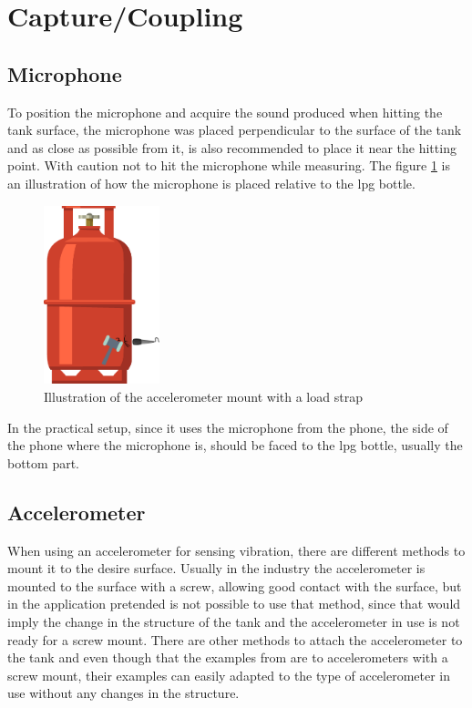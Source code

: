 \section{Capture/Coupling}\label{sec:CaptureCoupling}
\subsection{Microphone}
To position the microphone and acquire the sound produced when hitting the tank surface, the microphone was placed perpendicular to the surface of the tank and as close as possible from it, is also recommended to place it near the hitting point. With caution not to hit the microphone while measuring. The figure \ref{fig:micmount} is an illustration of how the microphone is placed relative to the \acrshort{lpg} bottle.
\begin{figure}[]
    \centering
    \includegraphics[width=0.3\textwidth]{Chapters/4CHP/Figures/micWimpactHamm.eps}
    \caption{Illustration of the accelerometer mount with a load strap}
    \label{fig:micmount}
\end{figure}
In the practical setup, since it uses the microphone from the phone, the side of the phone where the microphone is, should be faced to the \acrshort{lpg} bottle, usually the bottom part.
\subsection{Accelerometer}
When using an accelerometer for sensing vibration, there are different methods to mount it to the desire surface. Usually in the industry the accelerometer is mounted to the surface with a screw, allowing good contact with the surface, but in the application pretended is not possible to use that method, since that would imply the change in the structure of the tank and the accelerometer in use is not ready for a screw mount. There are other methods to attach the accelerometer to the tank and even though that the examples from \cite{GuidelinesMountingTest} are to accelerometers with a screw mount, their examples can easily adapted to the type of accelerometer in use without any changes in the structure.

